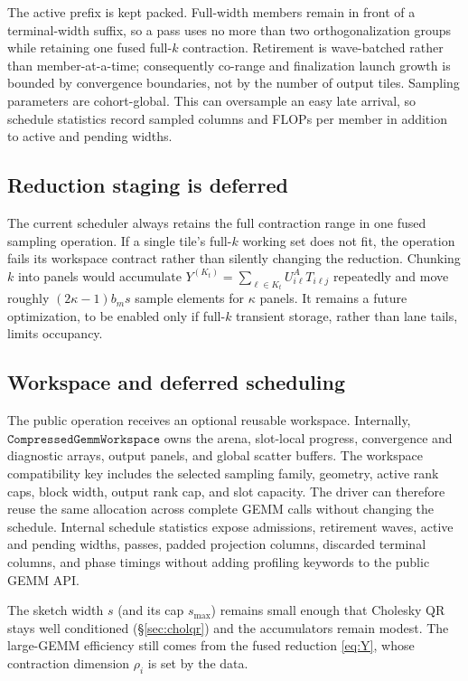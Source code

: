 \documentclass[11pt]{article}
\begin{document}
The active prefix is kept packed. Full-width members remain in front of a
terminal-width suffix, so a pass uses no more than two orthogonalization groups
while retaining one fused full-$k$ contraction. Retirement is wave-batched
rather than member-at-a-time; consequently co-range and finalization launch
growth is bounded by convergence boundaries, not by the number of output tiles.
Sampling parameters are cohort-global. This can oversample an easy late
arrival, so schedule statistics record sampled columns and FLOPs per member in
addition to active and pending widths.

\subsection{Reduction staging is deferred}
\label{sec:staging}

The current scheduler always retains the full contraction range in one fused
sampling operation. If a single tile's full-$k$ working set does not fit, the
operation fails its workspace contract rather than silently changing the
reduction. Chunking $k$ into panels would accumulate
$Y^{(K_t)}=\sum_{\ell\in K_t}U^A_{i\ell}T_{i\ell j}$ repeatedly and move roughly
$(2\kappa-1)b_ms$ sample elements for $\kappa$ panels. It remains a future
optimization, to be enabled only if full-$k$ transient storage, rather than
lane tails, limits occupancy.

\subsection{Workspace and deferred scheduling}
\label{sec:choose}

The public operation receives an optional reusable workspace. Internally,
$\texttt{CompressedGemmWorkspace}$ owns the arena, slot-local progress, convergence
and diagnostic arrays, output panels, and global scatter buffers. The workspace
compatibility key includes the selected sampling family, geometry, active rank
caps, block width, output rank cap, and slot capacity. The driver can therefore
reuse the same allocation across complete GEMM calls without changing the
schedule. Internal schedule statistics expose admissions, retirement waves,
active and pending widths, passes, padded projection columns, discarded
terminal columns, and phase timings without adding profiling keywords to the
public GEMM API.

The sketch width $s$ (and its cap $s_{\max}$) remains small enough that
Cholesky QR stays well conditioned (\S\ref{sec:cholqr}) and the accumulators
remain modest. The large-GEMM efficiency still comes from the fused reduction
\eqref{eq:Y}, whose contraction dimension $\rho_i$ is set by the data.
\end{document}

